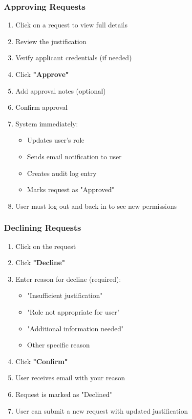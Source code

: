 \documentclass[12pt,a4paper]{article}
\begin{document}
\subsubsection{Approving Requests}
\begin{enumerate}[leftmargin=*]
    \item Click on a request to view full details
    \item Review the justification
    \item Verify applicant credentials (if needed)
    \item Click \textbf{"Approve"}
    \item Add approval notes (optional)
    \item Confirm approval
    \item System immediately:
        \begin{itemize}
            \item Updates user's role
            \item Sends email notification to user
            \item Creates audit log entry
            \item Marks request as "Approved"
        \end{itemize}
    \item User must log out and back in to see new permissions
\end{enumerate}

\subsubsection{Declining Requests}
\begin{enumerate}[leftmargin=*]
    \item Click on the request
    \item Click \textbf{"Decline"}
    \item Enter reason for decline (required):
        \begin{itemize}
            \item "Insufficient justification"
            \item "Role not appropriate for user"
            \item "Additional information needed"
            \item Other specific reason
        \end{itemize}
    \item Click \textbf{"Confirm"}
    \item User receives email with your reason
    \item Request is marked as "Declined"
    \item User can submit a new request with updated justification
\end{enumerate}
\end{document}
